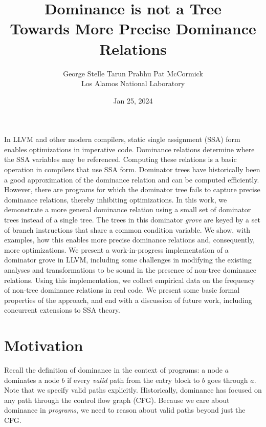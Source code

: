 \documentclass[a4paper,twocolumn]{article}
\title{Dominance is not a Tree \\
\Large{Towards More Precise Dominance Relations}}
\date{Jan 25, 2024}
\author{George Stelle \; Tarun Prabhu \; Pat McCormick \\ Los Alamos National Laboratory}
\begin{document}
\maketitle

In LLVM and other modern compilers, static single assignment (SSA) form
enables optimizations in
imperative code. Dominance relations determine where the SSA variables may be
referenced. Computing these relations is a basic operation in compilers that
use SSA form.
Dominator trees have historically been a good approximation of the dominance
relation and can be computed efficiently. However, there are programs for which the
dominator tree fails to capture precise dominance relations, thereby inhibiting
optimizations. In this work, we demonstrate a more general dominance
relation using a small set of dominator trees instead of a single tree. The
trees in this dominator \emph{grove} are keyed by a set of branch instructions 
that share a common condition variable. We show, with examples, how this 
enables more precise dominance relations and, consequently, more 
optimizations. We present a work-in-progress implementation of a
dominator grove in LLVM, including some challenges in modifying
the existing analyses and transformations to be sound in the presence of
non-tree dominance relations. Using this implementation, we collect empirical
data on the frequency of non-tree dominance relations in real code. We present
some basic formal properties of the approach, and end with a discussion of
future work, including concurrent extensions to SSA theory.  

\section*{Motivation}
Recall the definition of dominance in the context of programs: a node $a$
dominates a node $b$ if every \emph{valid} path from the entry block to $b$ goes
through $a$. Note that we specify valid paths explicitly. Historically,
dominance has focused on any path through the control flow graph (CFG).
Because we care about dominance in \emph{programs}, we need to reason about
valid paths beyond just the CFG. 
\end{document}
